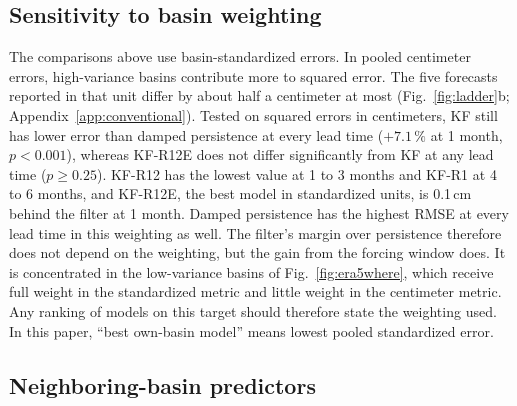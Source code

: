 \documentclass[hess, manuscript]{copernicus}
\begin{document}
\subsection{Sensitivity to basin weighting}
\label{sec:results-weighting}

The comparisons above use basin-standardized errors. In pooled
centimeter errors, high-variance basins contribute more to squared error. The
five forecasts reported in that unit differ by about half a centimeter at
most (Fig.~\ref{fig:ladder}b; Appendix~\ref{app:conventional}). Tested on
squared errors in centimeters,
KF still has lower error than damped persistence at every lead time
($+7.1\,\%$ at 1 month, $p < 0.001$), whereas KF-R12E does not differ
significantly from KF at any lead time ($p \ge 0.25$).
KF-R12 has the lowest value at 1 to 3 months and KF-R1 at 4 to 6 months,
and KF-R12E, the best model in standardized units, is
0.1\,cm behind the filter at 1 month. Damped persistence has the highest
RMSE at every lead time in this weighting as well.
The filter's margin over persistence therefore does not depend on the
weighting, but the gain from the forcing window does. It is concentrated in the low-variance basins of Fig.~\ref{fig:era5where}, which receive full weight in the standardized metric and little weight in the centimeter metric. Any ranking of models on this target should therefore state the weighting used. In this paper, ``best own-basin model'' means lowest pooled
standardized error.

\subsection{Neighboring-basin predictors}
\label{sec:results-dropped}
\end{document}
